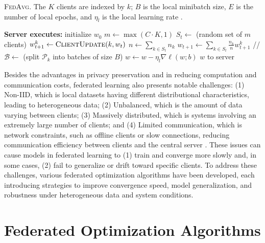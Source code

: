 \begin{algorithm}
\caption{\textsc{FedAvg}. The $K$ clients are indexed by $k$; $B$ is the local minibatch size, $E$ is the number of local epochs, and $\eta_l$ is the local learning rate \citep{mcmahan2023communication}.}
\label{alg:fedavg}
\begin{algorithmic}[1]
\State \textbf{Server executes:}
\State initialize $w_0$
    \State $m \gets \max(C \cdot K, 1)$
    \State $S_t \gets$ (random set of $m$ clients)
        \State $w^{k}_{t+1} \gets \textsc{ClientUpdate}(k, w_t)$
    \EndFor
    \State $n \gets \sum_{k \in S_t} n_k$
    \State $w_{t+1} \gets \sum_{k \in S_t} \frac{n_k}{n} w^{k}_{t+1}$
\EndFor
\Statex
{} \quad // 
    \State $\mathcal{B} \gets$ (split $\mathcal{P}_k$ into batches of size $B$)
            \State $w \gets w - \eta_l \nabla \ell(w; b)$
        \EndFor
    \EndFor
    \State \Return $w$ to server
\EndFunction
\end{algorithmic}
\end{algorithm}

Besides the advantages in privacy preservation and in reducing computation and communication costs, federated learning also presents notable challenges: (1) Non-IID, which is local datasets having different distributional characteristics, leading to heterogeneous data; (2) Unbalanced, which is the amount of data varying between clients; (3) Massively distributed, which is systems involving an extremely large number of clients; and (4) Limited communication, which is network constraints, such as offline clients or slow connections, reducing communication efficiency between clients and the central server \citep{mcmahan2023communication}. These issues can cause models in federated learning to (1) train and converge more slowly and, in some cases, (2) fail to generalize or drift toward specific clients. To address these challenges, various federated optimization algorithms have been developed, each introducing strategies to improve convergence speed, model generalization, and robustness under heterogeneous data and system conditions. 

\section{Federated Optimization Algorithms}

